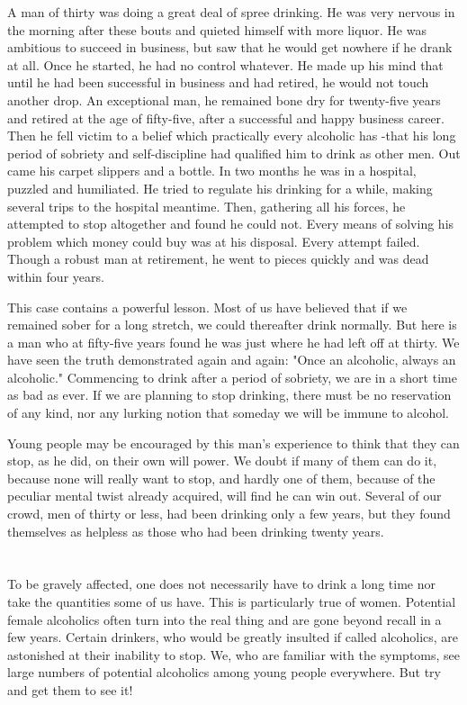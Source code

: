 A man of thirty was doing a great deal of spree drinking. 
He was very nervous in the morning after these bouts and quieted himself with more liquor. 
He was ambitious to succeed in business, 
but saw that he would get nowhere if he drank at all. 
Once he started, he had no control whatever. 
He made up his mind that until he had been successful in business and had retired, 
he would not touch another drop. 
An exceptional man, he remained bone dry for twenty-five years 
and retired at the age of fifty-five, 
after a successful and happy business career. 
Then he fell victim to a belief which practically every alcoholic has
-that his long period of sobriety and self-discipline had qualified him to drink as other men. 
Out came his carpet slippers and a bottle. 
In two months he was in a hospital, puzzled and humiliated. 
He tried to regulate his drinking for a while, 
making several trips to the hospital meantime. 
Then, gathering all his forces, he attempted to stop altogether and found he could not. 
Every means of solving his problem which money could buy was at his disposal. 
Every attempt failed. 
Though a robust man at retirement, 
he went to pieces quickly and was dead within four years.

This case contains a powerful lesson. 
Most of us have believed that if we remained sober for a long stretch, 
we could thereafter drink normally. 
But here is a man who at fifty-five years found he was just where he had left off at thirty. 
We have seen the truth demonstrated again and again: 
"Once an alcoholic, always an alcoholic." 
Commencing to drink after a period of sobriety, we are in a short time as bad as ever. 
If we are planning to stop drinking, there must be no reservation of any kind, 
nor any lurking notion that someday we will be immune to alcohol.

Young people may be encouraged by this man's experience to think that they can stop, 
as he did, on their own will power. 
We doubt if many of them can do it, because none will really want to stop, 
and hardly one of them, because of the peculiar mental twist already acquired, 
will find he can win out. 
Several of our crowd, men of thirty or less, had been drinking only a few years, 
but they found themselves as helpless as those who had been drinking twenty years.


\section{}

To be gravely affected, one does not necessarily have to drink a long time 
nor take the quantities some of us have. 
This is particularly true of women. 
Potential female alcoholics often turn into the real thing 
and are gone beyond recall in a few years. 
Certain drinkers, who would be greatly insulted if called alcoholics, 
are astonished at their inability to stop. 
We, who are familiar with the symptoms, 
see large numbers of potential alcoholics among young people everywhere. 
But try and get them to see it!  

